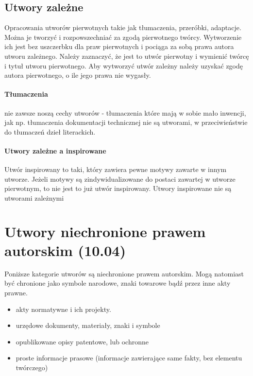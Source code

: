 \documentclass{article}
\begin{document}
\subsection{Utwory zależne}

Opracowania utworów pierwotnych takie jak tłumaczenia, przeróbki, adaptacje.
Można je tworzyć i rozpowszechniać za zgodą pierwotnego twórcy.
Wytworzenie ich jest bez uszczerbku dla praw pierwotnych i pociąga za sobą prawa autora utworu zależnego.
Należy zaznaczyć, że jest to utwór pierwotny i wymienić twórcę i tytuł utworu pierwotnego.
Aby wytworzyć utwór zależny należy uzyskać zgodę autora pierwotnego, o ile jego prawa nie wygasły.

\paragraph{Tłumaczenia}

nie zawsze noszą cechy utworów - tłumaczenia które mają w sobie mało inwencji,
jak np. tłumaczenia dokumentacji technicznej nie są utworami, w przeciwieństwie do tłumaczeń dzieł literackich.

\paragraph{Utwory zależne a inspirowane}

Utwór inspirowany to taki, który zawiera pewne motywy zawarte w innym utworze.
Jeżeli motywy są zindywidualizowane do postaci zawartej w utworze pierwotnym, to nie jest to już utwór inspirowany.
Utwory inspirowane nie są utworami zależnymi

\section{Utwory niechronione prawem autorskim (10.04)}

Poniższe kategorie utworów są niechronione prawem autorskim.
Mogą natomiast być chronione jako symbole narodowe, znaki towarowe bądź przez inne akty prawne.

\begin{itemize}
  \item akty normatywne i ich projekty.
  \item urzędowe dokumenty, materiały, znaki i symbole
  \item opublikowane opisy patentowe, lub ochronne
  \item proste informacje prasowe (informacje zawierające same fakty, bez elementu twórczego)
\end{itemize}
\end{document}

